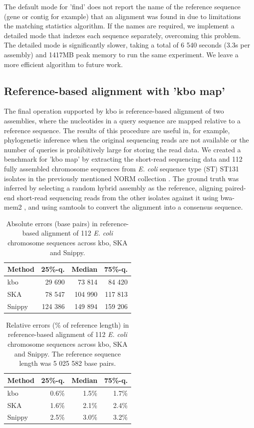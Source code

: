\documentclass[unnumsec,webpdf,contemporary,large]{oup-authoring-template}%
\theoremstyle{thmstyleone}%
\theoremstyle{thmstyletwo}%
\theoremstyle{thmstylethree}%
\begin{document}
The default mode for 'find' does not report the name of the reference sequence (gene or contig for example) that an alignment was found in due to limitations the matching statistics algorithm. If the names are required, we implement a detailed mode that indexes each sequence separately, overcoming this problem. The detailed mode is significantly slower, taking a total of 6 540 seconds (3.3s per assembly) and 1417MB peak memory to run the same experiment. We leave a more efficient algorithm to future work.

\subsection{Reference-based alignment with 'kbo map'}

The final operation supported by {\sf kbo} is reference-based alignment of two assemblies, where the nucleotides in a query sequence are mapped relative to a reference sequence. The results of this procedure are useful in, for example, phylogenetic inference when the original sequencing reads are not available or the number of queries is prohibitively large for storing the read data. We created a benchmark for 'kbo map' by extracting the short-read sequencing data and 112 fully assembled chromosome sequences from \textit{E. coli} sequence type (ST) ST131 isolates in the previously mentioned NORM collection \cite{gladstone2021emergence,arredondo2023escherichia}. The ground truth was inferred by selecting a random hybrid assembly as the reference, aligning paired-end short-read sequencing reads from the other isolates against it using bwa-mem2 \cite{vasimuddin2019efficient}, and using samtools \cite{10.1093/gigascience/giab008} to convert the alignment into a consensus sequence.

\begin{table}[]
\begin{tabular}{lrrr}
Method & 25\%-q.  & Median  & 75\%-q. \\
\hline
kbo    & 29 690 & 73 814   & 84 420  \\
SKA    & 78 547 & 104 990 & 117 813 \\
Snippy  & 124 386 & 149 894 & 159 206  \\
\end{tabular}
\caption{Absolute errors (base pairs) in reference-based alignment of 112 \textit{E. coli} chromosome sequences across kbo, SKA and Snippy.}
\label{map-absolute-error}
\end{table}
\begin{table}[]
\begin{tabular}{lrrr}
Method & 25\%-q.  & Median  & 75\%-q. \\
\hline
kbo    & 0.6\% & 1.5\% & 1.7\%  \\
SKA    & 1.6\% & 2.1\% & 2.4\% \\
Snippy  & 2.5\% & 3.0\%   & 3.2\%  \\
\end{tabular}
\caption{Relative errors (\% of reference length) in reference-based alignment of 112 \textit{E. coli} chromosome sequences across kbo, SKA and Snippy. The reference sequence length was 5 025 582 base pairs.}
\label{map-relative-error}
\end{table}
\end{document}
